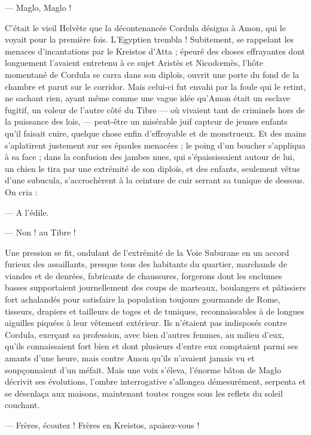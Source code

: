 \documentclass[a4paper, 11pt, oneside, polutonikogreek, french]{article}
\begin{document}
--- Maglo, Maglo !

C'était le vieil Helvète que la décontenancée Cordula désigna à Amon, qui le voyait pour la première fois. L'Egyptien trembla ! Subitement, se rappelant les menaces d'incantations par le Kreistos d'Atta ; épeuré des choses effrayantes dont longuement l'avaient entretenu à ce sujet Aristès et Nicodœmès, l'hôte momentané de Cordula se carra dans son diploïs, ouvrit une porte du fond de la chambre et parut sur le corridor. Mais celui-ci fut envahi par la foule qui le retint, ne sachant rien, ayant même comme une vague idée qu'Amon était un esclave fugitif, un voleur de l'autre côté du Tibre --- où vivaient tant de criminels hors de la puissance des lois, --- peut-être un misérable juif capteur de jeunes enfants qu'il faisait cuire, quelque chose enfin d'effroyable et de monstrueux. Et des mains s'aplatirent justement sur ses épaules menacées ; le poing d'un boucher s'appliqua à sa face ; dans la confusion des jambes nues, qui s'épaississaient autour de lui, un chien le tira par une extrémité de son diploïs, et des enfants, seulement vêtus d'une subucula, s'accrochèrent à la ceinture de cuir serrant sa tunique de dessous. On cria :

--- A l'édile.

--- Non ! au Tibre !

Une pression se fit, ondulant de l'extrémité de la Voie Suburane en un accord furieux des assaillants, presque tous des habitants du quartier, marchands de viandes et de denrées, fabricants de chaussures, forgerons dont les enclumes basses supportaient journellement des coups de marteaux, boulangers et pâtissiers fort achalandés pour satisfaire la population toujours gourmande de Rome, tisseurs, drapiers et tailleurs de toges et de tuniques, reconnaissables à de longues aiguilles piquées à leur vêtement extérieur. Ils n'étaient pas indisposés contre Cordula, exerçant sa profession, avec bien d'autres femmes, au milieu d'eux, qu'ils connaissaient fort bien et dont plusieurs d'entre eux comptaient parmi ses amants d'une heure, mais contre Amon qu'ils n'avaient jamais vu et soupçonnaient d'un méfait. Mais une voix s'éleva, l'énorme bâton de Maglo décrivit ses évolutions, l'ombre interrogative s'allongea démesurément, serpenta et se désenlaça aux maisons, maintenant toutes rouges sous les reflets du soleil couchant.

--- Frères, écoutez ! Frères en Kreistos, apaisez-vous !
\end{document}
